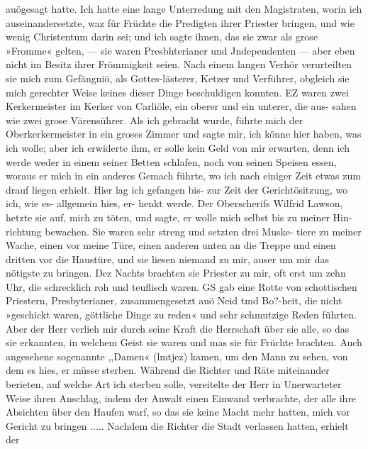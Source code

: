 {%
auögesagt hatte. Ich hatte eine lange Unterredung mit den
Magistraten, worin ich auseinandersetzte, waz für Früchte die
Predigten ihrer Priester bringen, und wie wenig Christentum darin
sei; und ich sagte ihnen, das sie zwar als grose »Fromme«
gelten, — sie waren Presbhterianer und Jndependenten — aber
eben nicht im Besitz ihrer Frömmigkeit seien. Nach einem langen
Verhör verurteilten sie mich zum Gefängniö, als Gottes-lästerer,
Ketzer und Verführer, obgleich sie mich gerechter Weise keines
dieser Dinge beschuldigen konnten. EZ waren zwei Kerkermeister
im Kerker von Carliöle, ein oberer und ein unterer, die aus-
sahen wie zwei grose Värensührer. Als ich gebracht wurde,
führte mich der Oberkerkermeister in ein groses Zimmer und sagte
mir, ich könne hier haben, was ich wolle; aber ich erwiderte
ihm, er solle kein Geld von mir erwarten, denn ich werde weder
in einem seiner Betten schlafen, noch von seinen Speisen essen,
woraus er mich in ein anderes Gemach führte, wo ich nach einiger
Zeit etwas zum drauf liegen erhielt. Hier lag ich gefangen bis-
zur Zeit der Gerichtösitzung, wo ich, wie es- allgemein hies, er-
henkt werde. Der Oberscherifs Wilfrid Lawson, hetzte sie auf,
mich zu töten, und sagte, er wolle mich selbst bis zu meiner Hin-
richtung bewachen. Sie waren sehr streng und setzten drei Muske-
tiere zu meiner Wache, einen vor meine Türe, einen anderen
unten an die Treppe und einen dritten vor die Haustüre, und
sie liesen niemand zu mir, auser um mir das nötigste zu bringen.
Dez Nachts brachten sie Priester zu mir, oft erst um zehn Uhr,
die schrecklich roh und teuflisch waren. GS gab eine Rotte von
schottischen Priestern, Presbyterianer, zusammengesetzt auö Neid
tmd Bo?-heit, die nicht »geschickt waren, göttliche Dinge zu reden«
und sehr schmutzige Reden führten. Aber der Herr verlieh mir
durch seine Kraft die Herrschaft über sie alle, so das sie erkannten,
in welchem Geist sie waren und mas sie für Früchte brachten.
Auch angesehene sogenannte ,,Damen« (lmtjez) kamen, um den
Mann zu sehen, von dem es hies, er müsse sterben. Während
die Richter und Räte miteinander berieten, auf welche Art ich
sterben solle, vereitelte der Herr in Unerwarteter Weise ihren
Anschlag, indem der Anwalt einen Einwand verbrachte, der
alle ihre Absichten über den Haufen warf, so das sie keine
Macht mehr hatten, mich vor Gericht zu bringen .....
Nachdem die Richter die Stadt verlassen hatten, erhielt der


}
